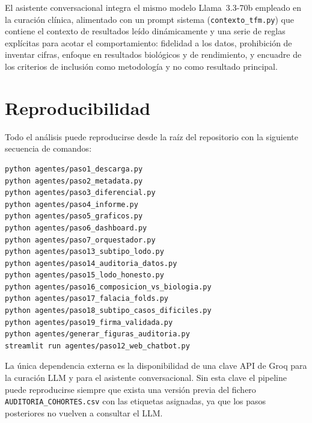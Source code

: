 El asistente conversacional integra el mismo modelo Llama~3.3-70b
empleado en la curación clínica, alimentado con un prompt sistema
(\texttt{contexto\_tfm.py}) que contiene el contexto de resultados leído
dinámicamente y una serie de reglas explícitas para acotar el
comportamiento: fidelidad a los datos, prohibición de inventar cifras,
enfoque en resultados biológicos y de rendimiento, y encuadre de los
criterios de inclusión como metodología y no como resultado principal.

\section{Reproducibilidad}
\label{sec:reproducibilidad}

Todo el análisis puede reproducirse desde la raíz del repositorio con la
siguiente secuencia de comandos:

\begin{lstlisting}[style=bash, caption={Reproducción completa del pipeline.}]
python agentes/paso1_descarga.py
python agentes/paso2_metadata.py
python agentes/paso3_diferencial.py
python agentes/paso4_informe.py
python agentes/paso5_graficos.py
python agentes/paso6_dashboard.py
python agentes/paso7_orquestador.py
python agentes/paso13_subtipo_lodo.py
python agentes/paso14_auditoria_datos.py
python agentes/paso15_lodo_honesto.py
python agentes/paso16_composicion_vs_biologia.py
python agentes/paso17_falacia_folds.py
python agentes/paso18_subtipo_casos_dificiles.py
python agentes/paso19_firma_validada.py
python agentes/generar_figuras_auditoria.py
streamlit run agentes/paso12_web_chatbot.py
\end{lstlisting}

La única dependencia externa es la disponibilidad de una clave API de Groq
para la curación LLM y para el asistente conversacional. Sin esta clave el
pipeline puede reproducirse siempre que exista una versión previa del
fichero \texttt{AUDITORIA\_COHORTES.csv} con las etiquetas asignadas, ya
que los pasos posteriores no vuelven a consultar el LLM.

